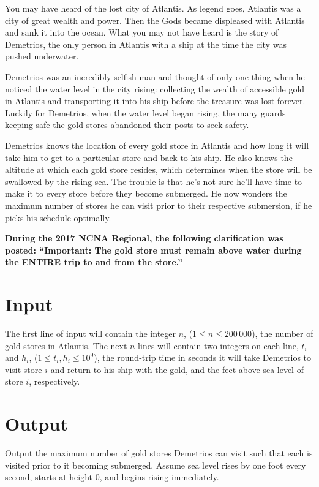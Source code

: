


You may have heard of the lost city of Atlantis. As legend goes,
Atlantis was a city of great wealth and power. Then the Gods became 
displeased with Atlantis and sank it into the ocean.
What you may not have heard is the story of Demetrios, the only person
in Atlantis with a ship at the time the city was pushed underwater.

Demetrios was an incredibly selfish man and thought of only one thing
when he noticed the water level in the city rising: collecting the
wealth of accessible gold in Atlantis and transporting it into his
ship before the treasure was lost forever. Luckily for Demetrios, when
the water level began rising, the many guards keeping safe the gold
stores abandoned their posts to seek safety.

Demetrios knows the location of every gold store in Atlantis and how
long it will take him to get to a particular store and back to his
ship. He also knows the altitude at which each gold store resides,
which determines when the store will be swallowed by the rising
sea. The trouble is that he's not sure he'll have time to make it to
every store before they become submerged. He now wonders the maximum
number of stores he can visit prior to their respective submersion, if
he picks his schedule optimally.

{ \bf
During the 2017 NCNA Regional, the following clarification was posted:
``Important: The gold store must remain above water during the ENTIRE trip to and from the store.''
}

\section*{Input}

The first line of input
will contain the integer $n$, ($1 \leq n \leq 200\,000$), the number of
gold stores in Atlantis. The next $n$ lines will contain two integers
on each line, $t_i$ and $h_i$, ($1 \leq t_i, h_i \leq 10^9$), the round-trip time in
seconds it will take Demetrios to visit store $i$ and return to his ship
with the gold, and the feet above sea level of store $i$, respectively.

\section*{Output}

Output the maximum number of gold stores Demetrios can visit such that
each is visited prior to it becoming submerged. Assume sea level rises
by one foot every second, starts at height $0$, and begins rising
immediately.
